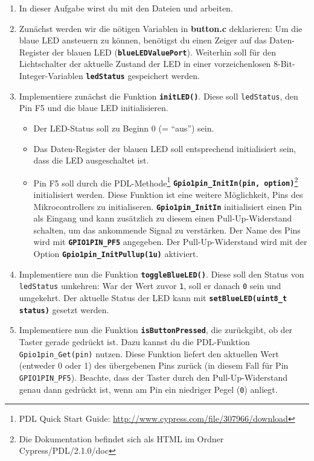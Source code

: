 \begin{enumerate}
\item 
In dieser Aufgabe wirst du mit den Dateien  und  arbeiten.

\item 
Zunächst werden wir die nötigen Variablen in \textbf{button.c} deklarieren:
Um die blaue LED ansteuern zu können, benötigst du einen Zeiger auf das Daten-Register der blauen LED (\textbf{\lstinline|blueLEDValuePort|}).
Weiterhin soll für den Lichtschalter der aktuelle Zustand der LED in einer vorzeichenlosen 8-Bit-Integer-Variablen \textbf{\lstinline|ledStatus|} gespeichert werden.

\item
Implementiere zunächst die Funktion \textbf{\lstinline|initLED()|}.
Diese soll \lstinline|ledStatus|, den Pin F5 und die blaue LED initialisieren.
\begin{itemize}
\item 
Der LED-Status soll zu Beginn 0 (= \enquote{aus}) sein.
\item 
Das Daten-Register der blauen LED soll entsprechend initialisiert sein, dass die LED ausgeschaltet ist.
\item 
Pin F5 soll durch die PDL-Methode\footnote{PDL Quick Start Guide: \url{http://www.cypress.com/file/307966/download}} \textbf{\lstinline|Gpio1pin_InitIn(pin, option)|}\footnote{Die Dokumentation befindet sich als HTML im Ordner Cypress/PDL/2.1.0/doc} initialisiert werden.
Diese Funktion ist eine weitere Möglichkeit, Pins des Mikrocontrollers zu initialiseren. 
\textbf{\lstinline|Gpio1pin_InitIn|} initialisiert einen Pin als Eingang und kann zusätzlich zu diesem einen Pull-Up-Widerstand schalten, um das ankommende Signal zu verstärken.
Der Name des Pins wird mit \textbf{\lstinline|GPIO1PIN_PF5|} angegeben.
Der Pull-Up-Widerstand wird mit der Option \textbf{\lstinline|Gpio1pin_InitPullup(1u)|} aktiviert.
\end{itemize}

\item
Implementiere nun die Funktion \textbf{\lstinline|toggleBlueLED()|}.
Diese soll den Status von \lstinline|ledStatus| umkehren:
War der Wert zuvor \lstinline|1|, soll er danach \lstinline|0| sein und umgekehrt.
Der aktuelle Status der LED kann mit \textbf{\lstinline|setBlueLED(uint8_t status)|} gesetzt werden. 

\item 
Implementiere nun die Funktion \textbf{\lstinline|isButtonPressed|}, die zurückgibt, ob der Taster gerade gedrückt ist.
Dazu kannst du die PDL-Funktion \lstinline|Gpio1pin_Get(pin)| nutzen.
Diese Funktion liefert den aktuellen Wert (entweder 0 oder 1) des übergebenen Pins zurück (in diesem Fall für Pin \lstinline|GPIO1PIN_PF5|).
Beachte, dass der Taster durch den Pull-Up-Widerstand genau dann gedrückt ist, wenn am Pin ein niedriger Pegel (\lstinline|0|) anliegt.


\end{enumerate}
